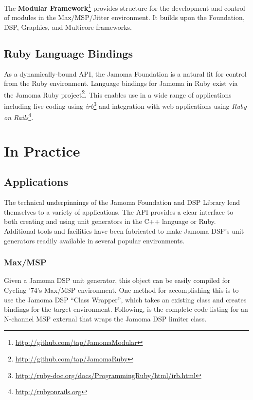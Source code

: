 \documentclass[twoside,10pt]{article}
\begin{document}
The \textbf{Modular Framework}\footnote{\url{http://github.com/tap/JamomaModular}} provides structure for the development and control of modules in the Max/MSP/Jitter environment.  It builds upon the Foundation, DSP, Graphics, and Multicore frameworks.



\subsection{Ruby Language Bindings} %

As a dynamically-bound API, the Jamoma Foundation is a natural fit for control from the Ruby environment.  Language bindings for Jamoma in Ruby exist via the Jamoma Ruby project\footnote{\url{http://github.com/tap/JamomaRuby}}.  This enables use in a wide range of applications including live coding using \emph{irb}\footnote{\url{http://ruby-doc.org/docs/ProgrammingRuby/html/irb.html}} and integration with web applications using \emph{Ruby on Rails}\footnote{\url{http://rubyonrails.org}}.




\section{In Practice} %

\subsection{Applications}

The technical underpinnings of the Jamoma Foundation and DSP Library lend themselves to a variety of applications.  The API provides a clear interface to both creating and using unit generators in the C++ language or Ruby.  Additional tools and facilities have been fabricated to make Jamoma DSP's unit generators readily available in several popular environments.


\subsubsection{Max/MSP}

Given a Jamoma DSP unit generator, this object can be easily compiled for Cycling '74's Max/MSP environment.  One method for accomplishing this is to use the Jamoma DSP ``Class Wrapper'', which takes an existing class and creates bindings for the target environment.  Following, is the complete code listing for an N-channel MSP external that wraps the Jamoma DSP limiter class.
\end{document}
